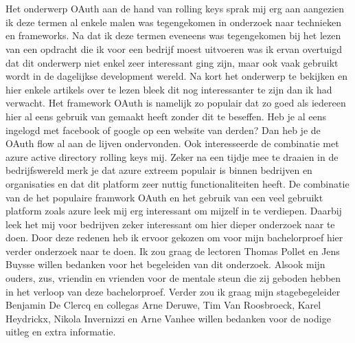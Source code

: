
\chapter*{}
\label{ch:voorwoord}

Het onderwerp OAuth aan de hand van rolling keys sprak mij erg aan aangezien ik deze termen al enkele malen was tegengekomen in onderzoek naar technieken en frameworks. Na dat ik deze termen eveneens was tegengekomen bij het lezen van een opdracht die ik voor een bedrijf moest uitvoeren was ik ervan overtuigd dat dit onderwerp niet enkel zeer interessant ging zijn, maar ook vaak gebruikt wordt in de dagelijkse development wereld. \newline\newline
Na kort het onderwerp te bekijken en hier enkele artikels over te lezen bleek dit nog interessanter te zijn dan ik had verwacht. Het framework OAuth is namelijk zo populair dat zo goed als iedereen hier al eens gebruik van gemaakt heeft zonder dit te beseffen. Heb je al eens ingelogd met facebook of google op een website van derden? Dan heb je de OAuth flow al aan de lijven ondervonden. \newline\newline
Ook interesseerde de combinatie met azure active directory rolling keys mij. Zeker na een tijdje mee te draaien in de bedrijfswereld merk je dat azure extreem populair is binnen bedrijven en organisaties en dat dit platform zeer nuttig functionaliteiten heeft. \newline\newline
De combinatie van de het populaire framwork OAuth en het gebruik van een veel gebruikt platform zoals azure leek mij erg interessant om mijzelf in te verdiepen. Daarbij leek het mij voor bedrijven zeker interessant om hier dieper onderzoek naar te doen. \newline\newline
Door deze redenen heb ik ervoor gekozen om voor mijn bachelorproef hier verder onderzoek naar te doen. \newline\newline
Ik zou graag de lectoren Thomas Pollet en Jens Buysse willen bedanken voor het begeleiden van dit onderzoek. Alsook mijn ouders, zus, vriendin en vrienden voor de mentale steun die zij geboden hebben in het verloop van deze bachelorproef. Verder zou ik graag mijn stagebegeleider Benjamin De Clercq en collegas Arne Deruwe, Tim Van Roosbroeck, Karel Heydrickx, Nikola Invernizzi en Arne Vanhee willen bedanken voor de nodige uitleg en extra informatie.

